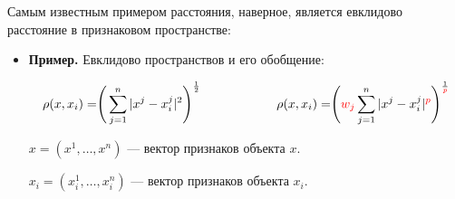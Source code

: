 \documentclass{article}
\begin{document}
Самым известным примером расстояния, наверное, является евклидово расстояние в признаковом пространстве:

\begin{itemize}
\item \textbf{Пример.} Евклидово пространствов и его обобщение:

$$\rho(x, x_i) = \Biggr(\sum\limits_{j = 1}^n |x^j - x_i^j|^2\Biggl)^\frac{1}{2}
\qquad\qquad\qquad
\rho(x, x_i) = \Biggr(\textcolor{red}{w_j}
\sum\limits_{j = 1}^n |x^j - x_i^j|^{\textcolor{red}{p}}
\Biggl)^\frac{1}{\textcolor{red}{p}}$$

$x = (x^1, \ldots, x^n)$ --- вектор признаков объекта $x$.

$x_i = (x_i^1, \ldots, x_i^n)$ --- вектор признаков объекта $x_i$.

\end{itemize}
\end{document}
